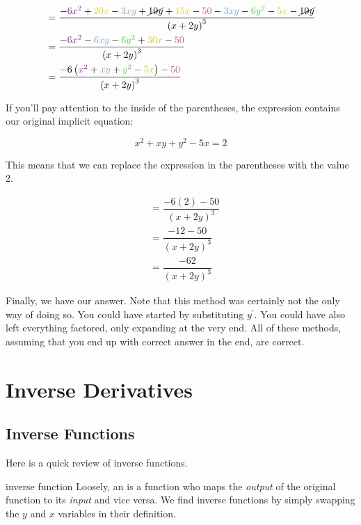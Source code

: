 \begin{align}
    &= \dfrac{-\textcolor{Plum}{6x^2} + \textcolor{yellow!80!black}{20x} - \textcolor{blue}{3xy} + \cancel{10y} + \textcolor{yellow!80!black}{15x} - \textcolor{darkred}{50} - \textcolor{blue}{3xy} - \textcolor{darkgreen}{6y^2} - \textcolor{yellow!80!black}{5x} - \cancel{10y}}{\left( x + 2y \right)^3} \\
    &= \dfrac{-\textcolor{Plum}{6x^2} - \textcolor{blue}{6xy} - \textcolor{darkgreen}{6y^2} + \textcolor{yellow!80!black}{30x} - \textcolor{darkred}{50}}{\left( x + 2y \right)^3} \\
    &= \dfrac{-6 \left( \textcolor{Plum}{x^2} + \textcolor{blue}{xy} + \textcolor{darkgreen}{y^2} - \textcolor{yellow!80!black}{5x} \right) - \textcolor{darkred}{50}}{\left( x + 2y \right)^3}
\end{align}

If you'll pay attention to the inside of the parentheses, the expression contains our original implicit equation:

\[ x^2 + xy + y^2 - 5x = 2 \]

This means that we can replace the expression in the parentheses with the value \( 2 \).

\begin{align}
    &= \dfrac{-6 \left( 2 \right) - 50}{\left(x + 2y \right)^3} \\
    &= \dfrac{-12 - 50}{\left( x + 2y \right)^3} \\
    &= \dfrac{-62}{\left( x + 2y \right)^3}
\end{align}

Finally, we have our answer. Note that this method was certainly not the only way of doing so. You could have started by substituting \( y^\prime \). You could have also left everything factored, only expanding at the very end. All of these methods, assuming that you end up with correct answer in the end, are correct.

\section{Inverse Derivatives}

\subsection{Inverse Functions}

Here is a quick review of inverse functions.

\begin{definition}{inverse function}
    Loosely, an  is a function who maps the \textit{output} of the original function to its \textit{input} and vice versa. We find inverse functions by simply swapping the \( y \) and \( x \) variables in their definition.
\end{definition}

